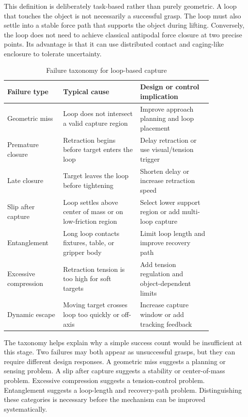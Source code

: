 This definition is deliberately task-based rather than purely geometric. A loop that touches the object is not necessarily a successful grasp. The loop must also settle into a stable force path that supports the object during lifting. Conversely, the loop does not need to achieve classical antipodal force closure at two precise points. Its advantage is that it can use distributed contact and caging-like enclosure to tolerate uncertainty.

\begin{table}[htbp]
    \centering
    \caption{Failure taxonomy for loop-based capture}
    \label{tab:lasso_failure_taxonomy}
    \begin{tabular}{p{0.22\linewidth} p{0.32\linewidth} p{0.30\linewidth}}
        \toprule
        Failure type & Typical cause & Design or control implication \\
        \midrule
        Geometric miss & Loop does not intersect a valid capture region & Improve approach planning and loop placement \\
        Premature closure & Retraction begins before target enters the loop & Delay retraction or use visual/tension trigger \\
        Late closure & Target leaves the loop before tightening & Shorten delay or increase retraction speed \\
        Slip after capture & Loop settles above center of mass or on low-friction region & Select lower support region or add multi-loop capture \\
        Entanglement & Long loop contacts fixtures, table, or gripper body & Limit loop length and improve recovery path \\
        Excessive compression & Retraction tension is too high for soft targets & Add tension regulation and object-dependent limits \\
        Dynamic escape & Moving target crosses loop too quickly or off-axis & Increase capture window or add tracking feedback \\
        \bottomrule
    \end{tabular}
\end{table}

The taxonomy helps explain why a simple success count would be insufficient at this stage. Two failures may both appear as unsuccessful grasps, but they can require different design responses. A geometric miss suggests a planning or sensing problem. A slip after capture suggests a stability or center-of-mass problem. Excessive compression suggests a tension-control problem. Entanglement suggests a loop-length and recovery-path problem. Distinguishing these categories is necessary before the mechanism can be improved systematically.

